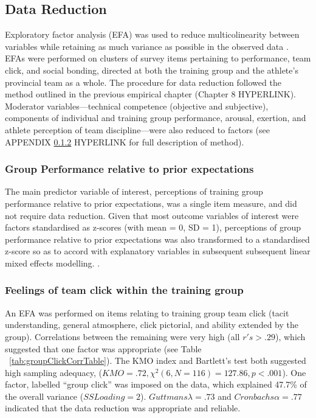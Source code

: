 \subsection{Data Reduction}
Exploratory factor analysis (EFA) was used to reduce multicolinearity between variables while retaining as much variance as possible in the observed data \citep[, see appendix ~\ref{appendix:EFA}]{Yong2013}.
EFAs were performed on clusters of survey items pertaining to performance, team click, and social bonding, directed at both the training group and the athlete's provincial team as a whole.  The procedure for data reduction followed the method outlined in the previous empirical chapter (Chapter 8 HYPERLINK).  Moderator variables---technical competence (objective and subjective), components of individual and training group performance, arousal, exertion, and athlete perception of team discipline---were also reduced to factors (see APPENDIX \ref{} HYPERLINK for full description of method).

\subsubsection{Group Performance relative to prior expectations}
The main predictor variable of interest, perceptions of training group performance relative to prior expectations, was a single item measure, and did not require data reduction.  Given that most outcome variables of interest were factors standardised as z-scores (with mean = 0, SD = 1), perceptions of group performance relative to prior expectations was also transformed to a standardised z-score so as to accord with explanatory variables in subsequent subsequent linear mixed effects modelling. \citep[for an explanation, see][]{}.

\subsubsection{Feelings of team click within the training group}
An EFA was performed on items relating to training group team click (tacit understanding, general atmosphere, click pictorial, and ability extended by the group).  Correlations between the remaining were very high (all $r's > .29$), which suggested that one factor was appropriate (see Table ~\ref{tab:groupClickCorrTable}). The KMO index and Bartlett's test both suggested high sampling adequacy, ($KMO =  .72, \chi^2(6, N = 116) = 127.86, p < .001$). One factor, labelled ``group click'' was imposed on the data, which explained 47.7\% of the overall variance ($SS Loading = 2$). $Guttmans \lambda = .73$ and $Cronbachs \alpha = .77$ indicated that the data reduction was appropriate and reliable.

